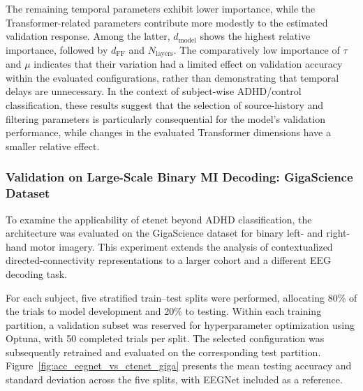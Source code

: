 The remaining temporal parameters exhibit lower importance, while the Transformer-related parameters contribute more modestly to the estimated validation response. Among the latter, $d_{\mathrm{model}}$ shows the highest relative importance, followed by $d_{\mathrm{FF}}$ and $N_{\mathrm{layers}}$. The comparatively low importance of $\tau$ and $\mu$ indicates that their variation had a limited effect on validation accuracy within the evaluated configurations, rather than demonstrating that temporal delays are unnecessary. In the context of subject-wise ADHD/control classification, these results suggest that the selection of source-history and filtering parameters is particularly consequential for the model's validation performance, while changes in the evaluated Transformer dimensions have a smaller relative effect.

\subsubsection{Validation on Large-Scale Binary MI Decoding: GigaScience Dataset}
To examine the applicability of \gls{ctenet} beyond ADHD classification, the architecture was evaluated on the GigaScience dataset for binary left- and right-hand motor imagery. This experiment extends the analysis of contextualized directed-connectivity representations to a larger cohort and a different EEG decoding task.

For each subject, five stratified train--test splits were performed, allocating 80\% of the trials to model development and 20\% to testing. Within each training partition, a validation subset was reserved for hyperparameter optimization using Optuna, with 50 completed trials per split. The selected configuration was subsequently retrained and evaluated on the corresponding test partition. Figure~\ref{fig:acc_eegnet_vs_ctenet_giga} presents the mean testing accuracy and standard deviation across the five splits, with EEGNet included as a reference.



